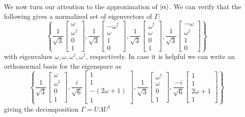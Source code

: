 \documentclass{article}
\theoremstyle{definition}
\theoremstyle{theorem}
\theoremstyle{remark}
\begin{document}
We now turn our attention to the approximation of $\ket{\alpha}$. We can verify that the following gives a normalized set of eigenvectors of $\Gamma$:
\[\left\{
	\frac{1}{\sqrt{3}}\begin{bmatrix} \omega \\ \omega^\dagger \\ 0 \\ 1 \end{bmatrix},
	\frac{1}{\sqrt{3}}\begin{bmatrix} -\omega^\dagger \\ \omega \\ 1 \\ 0 \end{bmatrix},
	\frac{1}{\sqrt{3}}\begin{bmatrix} \omega^\dagger \\ \omega \\ 0 \\ 1 \end{bmatrix},
	\frac{1}{\sqrt{3}}\begin{bmatrix} -\omega \\ \omega^\dagger \\ 1 \\ 0 \end{bmatrix}
\right\}\]
with eigenvalues $\omega, \omega, \omega^\dagger, \omega^\dagger$, respectively. In case it is helpful we can write an orthonormal basis for the eigenspace as
\[\left\{
	\frac{1}{\sqrt{3}}\begin{bmatrix} \omega \\ \omega^\dagger \\ 0 \\ 1 \end{bmatrix},
	\frac{i}{\sqrt{6}}\begin{bmatrix} 1 \\ 1 \\ -(2\omega + 1) \\ 1 \end{bmatrix},
	\frac{1}{\sqrt{3}}\begin{bmatrix} \omega^\dagger \\ \omega \\ 0 \\ 1 \end{bmatrix},
	\frac{-i}{\sqrt{6}}\begin{bmatrix} 1 \\ 1 \\ 2\omega + 1 \\ 1 \end{bmatrix}
\right\}\]
giving the decomposition $\Gamma=U\Lambda U^\dagger$
\end{document}
